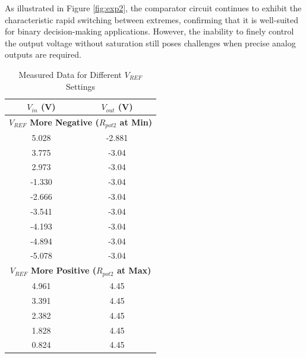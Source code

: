 \documentclass[12pt]{article}
\begin{document}
As illustrated in Figure \ref{fig:exp2}, the comparator circuit continues to exhibit the characteristic rapid switching between extremes, confirming that it is well-suited for binary decision-making applications. However, the inability to finely control the output voltage without saturation still poses challenges when precise analog outputs are required.
\begin{table}[H]
	\centering
	\caption{Measured Data for Different $V_{REF}$ Settings}
	\begin{tabular}{|c|c|}
		\hline
		$V_{in}$ (V) & $V_{out}$ (V)                                               \\
		\hline
		\multicolumn{2}{|c|}{\textbf{$V_{REF}$ More Negative ($R_{pot2}$ at Min)}} \\
		\hline
		5.028        & -2.881                                                      \\
		3.775        & -3.04                                                       \\
		2.973        & -3.04                                                       \\
		-1.330       & -3.04                                                       \\
		-2.666       & -3.04                                                       \\
		-3.541       & -3.04                                                       \\
		-4.193       & -3.04                                                       \\
		-4.894       & -3.04                                                       \\
		-5.078       & -3.04                                                       \\
		\hline
		\multicolumn{2}{|c|}{\textbf{$V_{REF}$ More Positive ($R_{pot2}$ at Max)}} \\
		\hline
		4.961        & 4.45                                                        \\
		3.391        & 4.45                                                        \\
		2.382        & 4.45                                                        \\
		1.828        & 4.45                                                        \\
		0.824        & 4.45                                                        \\

\end{tabular}
\end{table}
\end{document}
